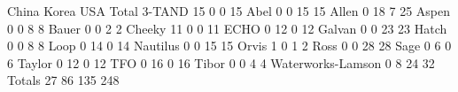                   China Korea USA Total
3-TAND               15     0   0    15
Abel                  0     0  15    15
Allen                 0    18   7    25
Aspen                 0     0   8     8
Bauer                 0     0   2     2
Cheeky               11     0   0    11
ECHO                  0    12   0    12
Galvan                0     0  23    23
Hatch                 0     0   8     8
Loop                  0    14   0    14
Nautilus              0     0  15    15
Orvis                 1     0   1     2
Ross                  0     0  28    28
Sage                  0     6   0     6
Taylor                0    12   0    12
TFO                   0    16   0    16
Tibor                 0     0   4     4
Waterworks-Lamson     0     8  24    32
Totals               27    86 135   248

